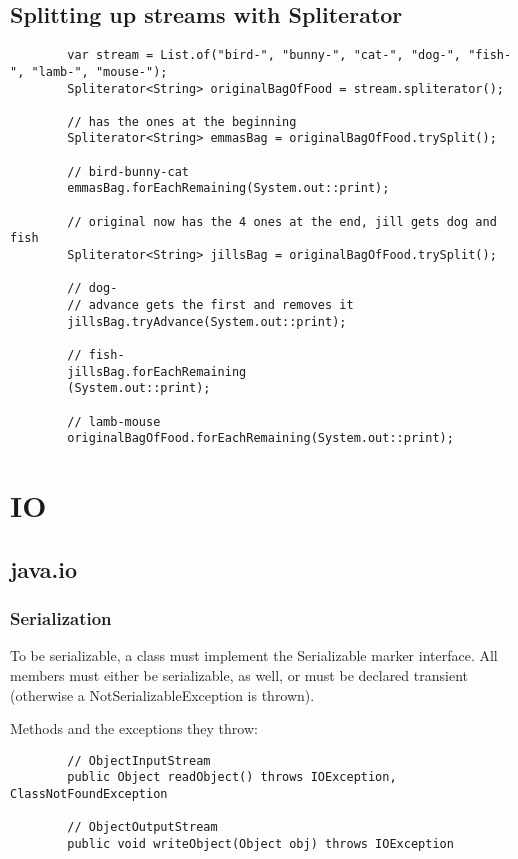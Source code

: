 \documentclass{scrartcl}
\begin{document}
\subsection{Splitting up streams with Spliterator}

    \begin{lstlisting}
        var stream = List.of("bird-", "bunny-", "cat-", "dog-", "fish-", "lamb-", "mouse-");
        Spliterator<String> originalBagOfFood = stream.spliterator();

        // has the ones at the beginning
        Spliterator<String> emmasBag = originalBagOfFood.trySplit();

        // bird-bunny-cat
        emmasBag.forEachRemaining(System.out::print);

        // original now has the 4 ones at the end, jill gets dog and fish
        Spliterator<String> jillsBag = originalBagOfFood.trySplit();

        // dog-
        // advance gets the first and removes it
        jillsBag.tryAdvance(System.out::print);

        // fish-
        jillsBag.forEachRemaining
        (System.out::print);

        // lamb-mouse
        originalBagOfFood.forEachRemaining(System.out::print);
    \end{lstlisting}

\section{IO}
\subsection{java.io}
\subsubsection{Serialization}

    To be serializable, a class must implement the Serializable marker interface.
    All members must either be serializable, as well, or must be declared transient (otherwise
    a NotSerializableException is thrown).

    Methods and the exceptions they throw:

    \begin{lstlisting}
        // ObjectInputStream
        public Object readObject() throws IOException, ClassNotFoundException

        // ObjectOutputStream
        public void writeObject(Object obj) throws IOException
    \end{lstlisting}
\end{document}
